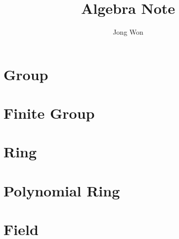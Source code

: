 \documentclass[8pt]{report}
\title{Algebra Note}
\author{Jong Won}
\affil{University of Seoul, Mathematics}
\date{}
\theoremstyle{romanstyle}
\begin{document}
\maketitle

\newpage
\tableofcontents %
\vspace{3cm}

\chapter{Group}

\chapter{Finite Group}

\chapter{Ring}
\chapter{Polynomial Ring}
\chapter{Field}
\end{document}

